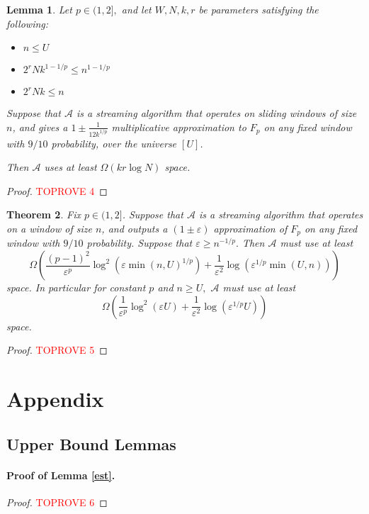 \documentclass{article}
\newcommand{\eps}{\varepsilon}
\theoremstyle{plain}
\newtheorem{theorem}{Theorem}[section]
\newtheorem{lem}[theorem]{Lemma}
\newcommand{\unisize}{U}
\newcommand{\window}{n}
\begin{document}
\begin{lem}
\label{lem:main_lower_bound}
Let $p\in (1,2],$ and let $W, N, k, r$ be parameters satisfying the following:
\begin{itemize}
\item $\window \leq \unisize$
\item $2^r N k^{1 - 1/p} \leq \window^{1-1/p}$
\item $2^r Nk \leq \window$
\end{itemize}
Suppose that $\mathcal{A}$ is a streaming algorithm that operates on sliding windows of size $\window$, and gives a $1 \pm \frac{1}{12 k^{1/p}}$ multiplicative approximation to $F_p$ on any fixed window with $9/10$ probability, over the universe $[\unisize]$.

Then $\mathcal{A}$ uses at least $\Omega(kr\log N)$ space.
\end{lem}

\begin{proof}\textcolor{red}{TOPROVE 4}\end{proof}
\begin{theorem}
Fix $p \in (1,2]$. Suppose that $\mathcal{A}$ is a streaming algorithm that operates on a window of size $\window$, and outputs a $(1\pm \eps)$ approximation of $F_p$ on any fixed window with $9/10$ probability. Suppose that $\eps \geq n^{-1/p}.$ Then $\mathcal{A}$ must use at least \[
\Omega\left(\frac{(p-1)^2}{\eps^p}\log^2(\eps \min(\window,\unisize)^{1/p})
+ \frac{1}{\eps^2}\log(\eps^{1/p} \min(\unisize, \window))
\right)
\]space.  In particular for constant $p$ and $\window \geq \unisize,$ $\mathcal{A}$ must use at least \[\Omega\left(\frac{1}{\eps^p}\log^2(\eps \unisize) + \frac{1}{\eps^2}\log(\eps^{1/p} \unisize)\right)\] space.
\end{theorem}
\begin{proof}\textcolor{red}{TOPROVE 5}\end{proof}
 



\newpage
\section{Appendix}
\subsection{Upper Bound Lemmas}
\paragraph{Proof of Lemma \ref{est}.}
\begin{proof}\textcolor{red}{TOPROVE 6}\end{proof}
\end{document}
